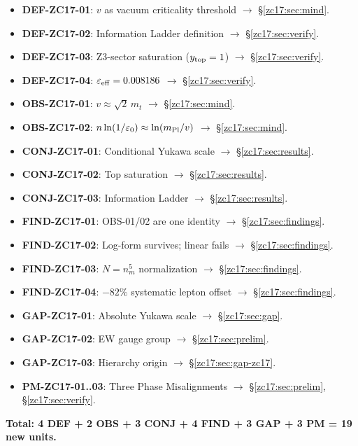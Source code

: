 \documentclass[12pt, a4paper]{article}
\begin{document}
\begin{formalbox}[title={Atomic units introduced by TASK-ZC17 (17 new units)}]
\begin{itemize}[leftmargin=*]
  \item \textbf{DEF-ZC17-01}: $v$ as vacuum criticality threshold
    $\to$ \S\ref{zc17:sec:mind}.
  \item \textbf{DEF-ZC17-02}: Information Ladder definition
    $\to$ \S\ref{zc17:sec:verify}.
  \item \textbf{DEF-ZC17-03}: Z3-sector saturation ($y_{\rm top}=1$)
    $\to$ \S\ref{zc17:sec:verify}.
  \item \textbf{DEF-ZC17-04}: $\varepsilon_{\rm eff}=0.008186$
    $\to$ \S\ref{zc17:sec:verify}.
  \item \textbf{OBS-ZC17-01}: $v\approx\sqrt{2}\,m_t$
    $\to$ \S\ref{zc17:sec:mind}.
  \item \textbf{OBS-ZC17-02}: $n\ln(1/\varepsilon_0)\approx\ln(m_{\rm Pl}/v)$
    $\to$ \S\ref{zc17:sec:mind}.
  \item \textbf{CONJ-ZC17-01}: Conditional Yukawa scale
    $\to$ \S\ref{zc17:sec:results}.
  \item \textbf{CONJ-ZC17-02}: Top saturation
    $\to$ \S\ref{zc17:sec:results}.
  \item \textbf{CONJ-ZC17-03}: Information Ladder
    $\to$ \S\ref{zc17:sec:results}.
  \item \textbf{FIND-ZC17-01}: OBS-01/02 are one identity
    $\to$ \S\ref{zc17:sec:findings}.
  \item \textbf{FIND-ZC17-02}: Log-form survives; linear fails
    $\to$ \S\ref{zc17:sec:findings}.
  \item \textbf{FIND-ZC17-03}: $N=n_m^5$ normalization
    $\to$ \S\ref{zc17:sec:findings}.
  \item \textbf{FIND-ZC17-04}: $-82\%$ systematic lepton offset
    $\to$ \S\ref{zc17:sec:findings}.
  \item \textbf{GAP-ZC17-01}: Absolute Yukawa scale
    $\to$ \S\ref{zc17:sec:gap}.
  \item \textbf{GAP-ZC17-02}: EW gauge group
    $\to$ \S\ref{zc17:sec:prelim}.
  \item \textbf{GAP-ZC17-03}: Hierarchy origin
    $\to$ \S\ref{zc17:sec:gap-zc17}.
  \item \textbf{PM-ZC17-01..03}: Three Phase Misalignments
    $\to$ \S\ref{zc17:sec:prelim}, \S\ref{zc17:sec:verify}.
\end{itemize}
\textbf{Total: 4 DEF + 2 OBS + 3 CONJ + 4 FIND
+ 3 GAP + 3 PM = 19 new units.}
\end{formalbox}
\end{document}
